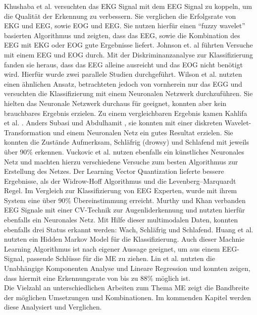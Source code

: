 {Khushaba et al. \cite{Khushaba_5580017} versuchten das EKG Signal mit dem EEG Signal zu koppeln, um die Qualität der Erkennung zu verbessern. Sie verglichen die Erfolgsrate von EKG und EEG, sowie EOG und EEG. Sie nutzen hierfür einen "`fuzzy wavelet"' basierten Algorithmus und zeigten, dass das EEG, sowie die Kombination des EEG mit EKG oder EOG gute Ergebnisse liefert. Johnson et. al \cite{Johnson11} führten Versuche mit einem EEG und EOG durch. Mit der Diskriminanzanalyse zur Klassifizierung fanden sie heraus, dass das EEG alleine ausreicht und das EOG nicht benötigt wird. Hierfür wurde zwei parallele Studien durchgeführt. Wilson et al. \cite{wilson_890161} nutzten einen ähnlichen Ansatz, betrachteten jedoch von vornherein nur das EGG und versuchten die Klassifizierung mit einem Neuronalen Netzwerk durchzuführen. Sie hielten das Neuronale Netzwerk durchaus für geeignet, konnten aber kein brauchbares Ergebnis erzielen. Zu einem vergleichbaren Ergebnis kamen Kahlifa et al. \cite{khalifa_893852}. Anders Subasi und Abdulhamit \cite{Subasi:2005:ARA:1707423.1707550}, sie konnten mit einer diskreten Wavelet-Transformation und einem Neuronalen Netz ein gutes Resultat erzielen. Sie konnten die Zustände Aufmerksam, Schläfrig (drowsy) und Schlafend mit jeweils über 90\% erkennen. Vuckovic et al. \cite{Vuckovic2002349} nutzen ebenfalls ein künstliches Neuronales Netz und machten hierzu verschiedene Versuche zum besten Algorithmus zur Erstellung des Netzes. Der Learning Vector Quantization lieferte bessere Ergebnisse, als der Widrow-Hoff Algorithmus und die Levenberg–Marquardt Regel. Im Vergleich zur Klassifizierung von EEG Experten, wurde mit ihrem System  eine über 90\% Übereinstimmung erreicht. Murthy und Khan \cite{Murthy_1} verbanden EEG Signale mit einer CV-Technik zur Augenliderkennung und nutzten hierfür ebenfalls ein Neuronales Netz. Mit Hilfe dieser multimodalen Daten, konnten ebenfalls drei Status erkannt werden: Wach, Schläfrig und Schlafend.
Huang et al. \cite{Huang_548971} nutzten ein Hidden Markov Model für die Klassifizierung. Auch dieser Machnie Learning Algorithmus ist nach eigener Aussage geeignet, um aus einem EEG-Signal, passende Schlüsse für die \acl{ME} zu ziehen. Lin et al. \cite{Lin05eeg-baseddrowsiness} nutzten die Unabhängige Komponenten Analyse und Lineare Regression und konnten zeigen, dass hiermit eine Erkennungsrate von bis zu 88\% möglich ist.\\

Die Vielzahl an unterschiedlichen Arbeiten zum Thema \acl{ME} zeigt die Bandbreite der möglichen Umsetzungen und Kombinationen. Im kommenden Kapitel werden diese Analysiert und Verglichen.

}
